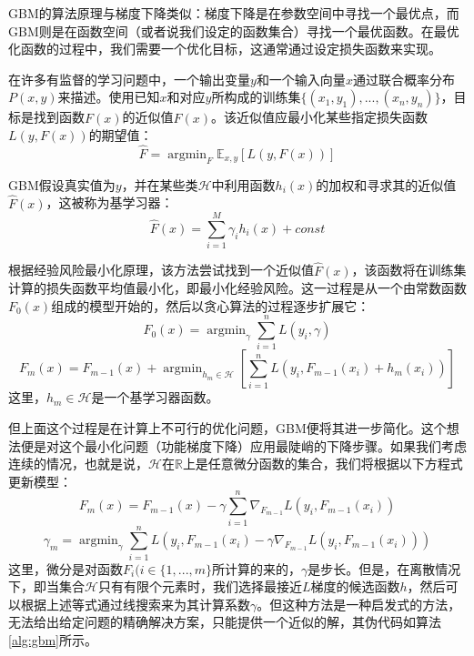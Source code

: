   GBM的算法原理与梯度下降类似：梯度下降是在参数空间中寻找一个最优点，而GBM则是在函数空间（或者说我们设定的函数集合）寻找一个最优函数。在最优化函数的过程中，我们需要一个优化目标，这通常通过设定损失函数来实现。

  在许多有监督的学习问题中，一个输出变量$y$和一个输入向量$x$通过联合概率分布$P(x,y)$来描述。使用已知$x$和对应$y$所构成的训练集$\{(x_{1},y_{1}),...,(x_{n},y_{n})\}$，目标是找到函数$F(x)$的近似值$\hat{F}(x)$。该近似值应最小化某些指定损失函数$L(y,F(x))$的期望值：
\begin{equation}
  \hat{F} = \mathop{\arg\min}_{F}\mathbb{E}_{x,y}[L(y,F(x))]
\end{equation}

  GBM假设真实值为$y$，并在某些类$\mathcal{H}$中利用函数$h_{i}(x)$的加权和寻求其的近似值$\hat{F}(x)$，这被称为基学习器：
\begin{equation}
  \hat{F}(x) = \sum^{M}_{i=1}\gamma_{i}h_{i}(x) + const
\end{equation}

  根据经验风险最小化原理，该方法尝试找到一个近似值$\hat{F}(x)$，该函数将在训练集计算的损失函数平均值最小化，即最小化经验风险。这一过程是从一个由常数函数$F_{0}(x)$组成的模型开始的，然后以贪心算法的过程逐步扩展它：
\begin{equation}
  F_{0}(x) = \mathop{\arg\min}_{\gamma}\sum^{n}_{i=1}L(y_{i},\gamma)
\end{equation}
\begin{equation}
  F_{m}(x) = F_{m-1}(x) + \mathop{\arg\min}_{h_{m}\in{\mathcal{H}}}\left[\sum^{n}_{i=1}L(y_{i},F_{m-1}(x_{i}) + h_{m}(x_{i}))\right]
\end{equation}
这里，$h_{m}\in{\mathcal{H}}$是一个基学习器函数。

  但上面这个过程是在计算上不可行的优化问题，GBM便将其进一步简化。这个想法便是对这个最小化问题（功能梯度下降）应用最陡峭的下降步骤。如果我们考虑连续的情况，也就是说，$\mathcal{H}$在$\mathbb{R}$上是任意微分函数的集合，我们将根据以下方程式更新模型：
\begin{equation}
  F_{m}(x) = F_{m-1}(x) - \gamma\sum^{n}_{i=1}{\nabla}_{F_{m-1}}L(y_{i},F_{m-1}(x_{i}))
\end{equation}
\begin{equation}
  {\gamma}_{m} = \mathop{\arg\min}_{\gamma}\sum^{n}_{i=1}L(y_{i},F_{m-1}(x_{i}) - \gamma{\nabla}_{F_{m-1}}L(y_{i},F_{m-1}(x_{i})))
\end{equation}
这里，微分是对函数$F_{i}(i\in\{1,...,m\}$所计算的来的，$\gamma$是步长。但是，在离散情况下，即当集合$\mathcal{H}$只有有限个元素时，我们选择最接近$L$梯度的候选函数$h$，然后可以根据上述等式通过线搜索来为其计算系数$\gamma$。但这种方法是一种启发式的方法，无法给出给定问题的精确解决方案，只能提供一个近似的解，其伪代码如算法\ref{alg:gbm}所示。

